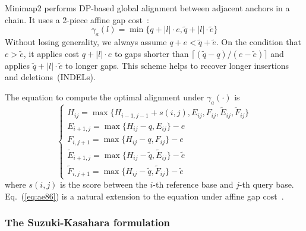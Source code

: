 \documentclass{bioinfo}
\begin{document}
\begin{methods}
Minimap2 performs DP-based global alignment between adjacent anchors in a
chain. It uses a 2-piece affine gap cost~\citep{Gotoh:1990aa}:
\begin{equation}\label{eq:2-piece}
\gamma_a(l)=\min\{q+|l|\cdot e,\tilde{q}+|l|\cdot\tilde{e}\}
\end{equation}
Without losing generality, we always assume $q+e<\tilde{q}+\tilde{e}$.
On the condition that $e>\tilde{e}$, it applies cost $q+|l|\cdot e$ to gaps
shorter than $\lceil(\tilde{q}-q)/(e-\tilde{e})\rceil$ and applies
$\tilde{q}+|l|\cdot\tilde{e}$ to longer gaps.  This scheme helps to recover
longer insertions and deletions~(INDELs).

The equation to compute the optimal alignment under $\gamma_a(\cdot)$ is
\begin{equation}\label{eq:ae86}
\left\{\begin{array}{l}
H_{ij} = \max\{H_{i-1,j-1}+s(i,j),E_{ij},F_{ij},\tilde{E}_{ij},\tilde{F}_{ij}\}\\
E_{i+1,j}= \max\{H_{ij}-q,E_{ij}\}-e\\
F_{i,j+1}= \max\{H_{ij}-q,F_{ij}\}-e\\
\tilde{E}_{i+1,j}= \max\{H_{ij}-\tilde{q},\tilde{E}_{ij}\}-\tilde{e}\\
\tilde{F}_{i,j+1}= \max\{H_{ij}-\tilde{q},\tilde{F}_{ij}\}-\tilde{e}
\end{array}\right.
\end{equation}
where $s(i,j)$ is the score between the $i$-th reference base and $j$-th query
base. Eq.~(\ref{eq:ae86}) is a natural extension to the equation under affine
gap cost~\citep{Gotoh:1982aa,Altschul:1986aa}.

\subsubsection{The Suzuki-Kasahara formulation}


\end{methods}
\end{document}
